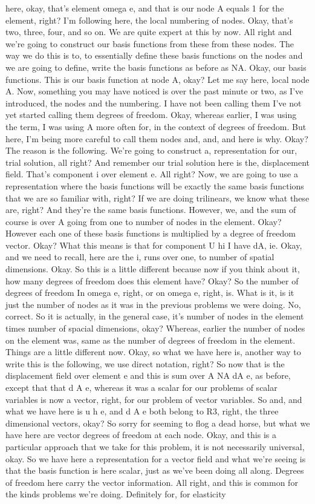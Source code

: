 \documentclass[10pt]{article}
\begin{document}
here, okay, that's element omega e, and that is our node A equals 1 for the element, right? I'm following here, the local numbering of nodes. Okay, that's two, three, four, and so on. We are quite expert at this by now. All right and we're going to construct our basis functions from these from these nodes. The way we do this is to, to essentially define these basis functions on the nodes and we are going to define, write the basis functions as before as NA. Okay, our basis functions. This is our basis function at node A, okay? Let me say here, local node A. Now, something you may have noticed is over the past minute or two, as I've introduced, the nodes and the numbering. I have not been calling them I've not yet started calling them degrees of freedom. Okay, whereas earlier, I was using the term, I was using A more often for, in the context of degrees of freedom. But here, I'm being more careful to call them nodes and, and, and here is why. Okay? The reason is the following. We're going to construct a, representation for our, trial solution, all right? And remember our trial solution here is the, displacement field. That's component i over element e. All right? Now, we are going to use a representation where the basis functions will be exactly the same basis functions that we are so familiar with, right? If we are doing trilinears, we know what these are, right? And they're the same basis functions. However, we, and the sum of course is over A going from one to number of nodes in the element. Okay? However each one of these basis functions is multiplied by a degree of freedom vector. Okay? What this means is that for component U hi I have dA, ie. Okay, and we need to recall, here are the i, runs over one, to number of spatial dimensions. Okay. So this is a little different because now if you think about it, how many degrees of freedom does this element have? Okay? So the number of degrees of freedom In omega e, right, or on omega e, right, is. What is it, is it just the number of nodes as it was in the previous problems we were doing. No, correct. So it is actually, in the general case, it's number of nodes in the element times number of spacial dimensions, okay? Whereas, earlier the number of nodes on the element was, same as the number of degrees of freedom in the element. Things are a little different now. Okay, so what we have here is, another way to write this is the following, we use direct notation, right? So now that is the displacement field over element e and this is sum over A NA dA e, as before, except that that d A e, whereas it was a scalar for our problems of scalar variables is now a vector, right, for our problem of vector variables. So and, and what we have here is u h e, and d A e both belong to R3, right, the three dimensional vectors, okay? So sorry for seeming to flog a dead horse, but what we have here are vector degrees of freedom at each node. Okay, and this is a particular approach that we take for this problem, it is not necessarily universal, okay. So we have here a representation for a vector field and what we're seeing is that the basis function is here scalar, just as we've been doing all along. Degrees of freedom here carry the vector information. All right, and this is common for the kinds problems we're doing. Definitely for, for elasticity 
\end{document}
